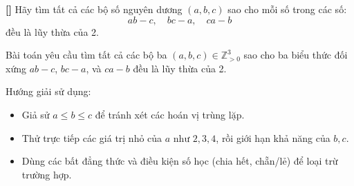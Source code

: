 \documentclass[../06-largest-exponent.tex]{subfiles}
\begin{document}
\begin{example*}\label{example:IMO-2015-P2}\textbf{[]}
	Hãy tìm tất cả các bộ số nguyên dương \( (a, b, c) \) sao cho mỗi số trong các số:
	\[
		ab - c,\quad bc - a,\quad ca - b
	\]
	đều là lũy thừa của 2.
\end{example*}

\begin{story*}
    Bài toán yêu cầu tìm tất cả các bộ ba \( (a, b, c) \in \mathbb{Z}_{>0}^3 \) sao cho ba biểu thức đối xứng \( ab - c \), \( bc - a \), và \( ca - b \) đều là lũy thừa của 2.

    Hướng giải sử dụng:
    \begin{itemize}[topsep=0pt, partopsep=0pt, itemsep=0pt]
        \item Giả sử \( a \le b \le c \) để tránh xét các hoán vị trùng lặp.
        \item Thử trực tiếp các giá trị nhỏ của \( a \) như \( 2, 3, 4 \), rồi giới hạn khả năng của \( b, c \).
        \item Dùng các bất đẳng thức và điều kiện số học (chia hết, chẵn/lẻ) để loại trừ trường hợp.
    \end{itemize}
\end{story*}
\end{document}
